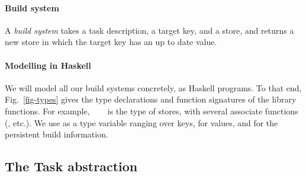 \vspace{-2mm}
\paragraph{Build system} A \emph{build system} takes a task description, a target
key, and a store, and returns a new store in which the target key has an
up to date value.

\vspace{-2mm}
\paragraph{Modelling in Haskell} We will model all our build systems concretely,
as Haskell programs. To that end, Fig.~\ref{fig-types} gives the type
declarations and function signatures of the library functions. For example,
~~~ is the type of stores, with several associate
functions (, etc.). We use  as a type
variable ranging over keys,  for values, and  for the persistent
build information.

\subsection{The Task abstraction}\label{sec-task}

